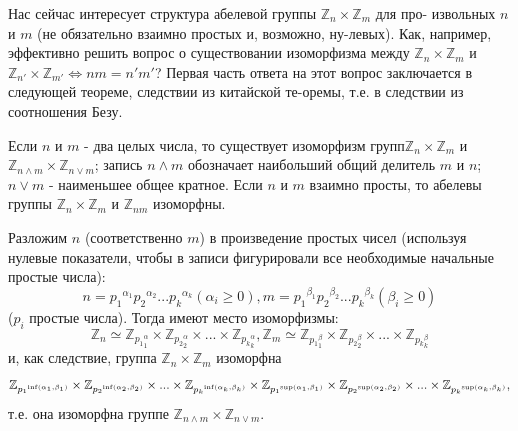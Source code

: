   Нас сейчас интересует структура абелевой группы $\mathbb{Z}_n \times \mathbb{Z}_m$ для про- \linebreak извольных $n$ и $m$ (не обязательно взаимно простых и, возможно, ну-\linebreak левых). Как, например, эффективно решить вопрос о существовании \linebreak изоморфизма между $\mathbb{Z}_n \times \mathbb{Z}_m$ и  $\mathbb{Z}_{n'} \times \mathbb{Z}_{m'} \Longleftrightarrow nm=n'm'$? Первая часть ответа на этот \linebreak вопрос заключается в следующей теореме, следствии из китайской те-\linebreak оремы, т.е. в следствии из соотношения Безу.
\begin{thm}

  Если $n$ и $m$ - два целых числа, то существует изоморфизм групп\linebreak $\mathbb{Z}_n \times \mathbb{Z}_m$ и $\mathbb{Z}_{n \wedge m} \times \mathbb{Z}_{n \vee m}$; запись  $n \wedge m$ обозначает наибольший общий \linebreak делитель $m$ и $n$; $n \vee m$ - наименьшее общее кратное. Если $n$ и $m$ взаимно \linebreak просты, то абелевы группы $\mathbb{Z}_n \times \mathbb{Z}_m$ и $\mathbb{Z}_{nm}$ изоморфны.
\end{thm}
\newpage
\begin{myproof}
Разложим $n$ (соответственно $m$) в произведение простых чисел \linebreak(используя нулевые показатели, чтобы в записи фигурировали все \linebreak необходимые начальные простые числа):
$$n={p_1}^{\alpha_1}{p_2}^{\alpha_2}...{p_k}^{\alpha_k} (\alpha_i \ge 0), m={p_1}^{\beta
_1}{p_2}^{\beta_2}...{p_k}^{\beta_k} (\beta_i \ge 0)$$
($p_i$ простые числа).
Тогда имеют место изоморфизмы:
$$\mathbb{Z}_n \simeq \mathbb{Z}_{{p_1}^\alpha_1} \times \mathbb{Z}_{{p_2}^\alpha_2} \times ... \times \mathbb{Z}_{{p_k}^\alpha_k}, \mathbb{Z}_m \simeq \mathbb{Z}_{{p_1}^\beta_1} \times \mathbb{Z}_{{p_2}^\beta_2} \times ... \times \mathbb{Z}_{{p_k}^\beta_k}$$
и, как следствие, группа $\mathbb{Z}_n \times \mathbb{Z}_m$ изоморфна
$$\mathbb{Z}_{{p_1}^{\inf(\alpha_1, \beta_1)}} \times \mathbb{Z}_{{p_2}^{\inf(\alpha_2, \beta_2)}} \times ... \times \mathbb{Z}_{{p_k}^{\inf(\alpha_k, \beta_k)}}\linebreak \times \mathbb{Z}_{{p_1}^{\sup(\alpha_1, \beta_1)}} \times \mathbb{Z}_{{p_2}^{\sup(\alpha_2, \beta_2)}} \times ... \times \mathbb{Z}_{{p_k}^{\sup(\alpha_k, \beta_k)}},$$
т.е. она изоморфна группе $\mathbb{Z}_{n \wedge m} \times \mathbb{Z}_{n \vee m}$.
\end{myproof}
